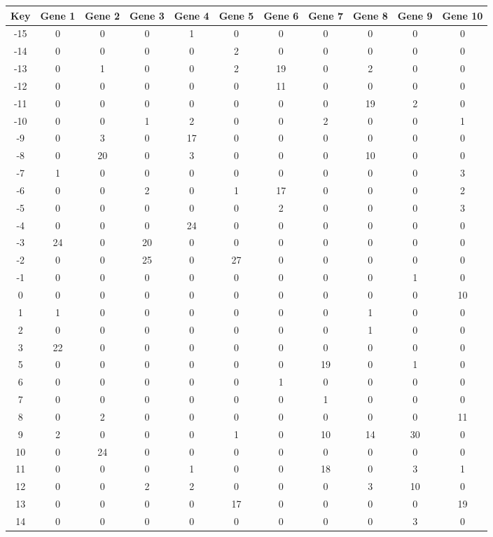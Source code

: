 \begin{tabular}{|c|c|c|c|c|c|c|c|c|c|c|}
\hline
Key & Gene 1 & Gene 2 & Gene 3 & Gene 4 & Gene 5 & Gene 6 & Gene 7 & Gene 8 & Gene 9 & Gene 10 \\
\hline
-15 & 0 & 0 & 0 & 1 & 0 & 0 & 0 & 0 & 0 & 0 \\
-14 & 0 & 0 & 0 & 0 & 2 & 0 & 0 & 0 & 0 & 0 \\
-13 & 0 & 1 & 0 & 0 & 2 & 19 & 0 & 2 & 0 & 0 \\
-12 & 0 & 0 & 0 & 0 & 0 & 11 & 0 & 0 & 0 & 0 \\
-11 & 0 & 0 & 0 & 0 & 0 & 0 & 0 & 19 & 2 & 0 \\
-10 & 0 & 0 & 1 & 2 & 0 & 0 & 2 & 0 & 0 & 1 \\
-9 & 0 & 3 & 0 & 17 & 0 & 0 & 0 & 0 & 0 & 0 \\
-8 & 0 & 20 & 0 & 3 & 0 & 0 & 0 & 10 & 0 & 0 \\
-7 & 1 & 0 & 0 & 0 & 0 & 0 & 0 & 0 & 0 & 3 \\
-6 & 0 & 0 & 2 & 0 & 1 & 17 & 0 & 0 & 0 & 2 \\
-5 & 0 & 0 & 0 & 0 & 0 & 2 & 0 & 0 & 0 & 3 \\
-4 & 0 & 0 & 0 & 24 & 0 & 0 & 0 & 0 & 0 & 0 \\
-3 & 24 & 0 & 20 & 0 & 0 & 0 & 0 & 0 & 0 & 0 \\
-2 & 0 & 0 & 25 & 0 & 27 & 0 & 0 & 0 & 0 & 0 \\
-1 & 0 & 0 & 0 & 0 & 0 & 0 & 0 & 0 & 1 & 0 \\
0 & 0 & 0 & 0 & 0 & 0 & 0 & 0 & 0 & 0 & 10 \\
1 & 1 & 0 & 0 & 0 & 0 & 0 & 0 & 1 & 0 & 0 \\
2 & 0 & 0 & 0 & 0 & 0 & 0 & 0 & 1 & 0 & 0 \\
3 & 22 & 0 & 0 & 0 & 0 & 0 & 0 & 0 & 0 & 0 \\
5 & 0 & 0 & 0 & 0 & 0 & 0 & 19 & 0 & 1 & 0 \\
6 & 0 & 0 & 0 & 0 & 0 & 1 & 0 & 0 & 0 & 0 \\
7 & 0 & 0 & 0 & 0 & 0 & 0 & 1 & 0 & 0 & 0 \\
8 & 0 & 2 & 0 & 0 & 0 & 0 & 0 & 0 & 0 & 11 \\
9 & 2 & 0 & 0 & 0 & 1 & 0 & 10 & 14 & 30 & 0 \\
10 & 0 & 24 & 0 & 0 & 0 & 0 & 0 & 0 & 0 & 0 \\
11 & 0 & 0 & 0 & 1 & 0 & 0 & 18 & 0 & 3 & 1 \\
12 & 0 & 0 & 2 & 2 & 0 & 0 & 0 & 3 & 10 & 0 \\
13 & 0 & 0 & 0 & 0 & 17 & 0 & 0 & 0 & 0 & 19 \\
14 & 0 & 0 & 0 & 0 & 0 & 0 & 0 & 0 & 3 & 0 \\
\hline
\end{tabular}